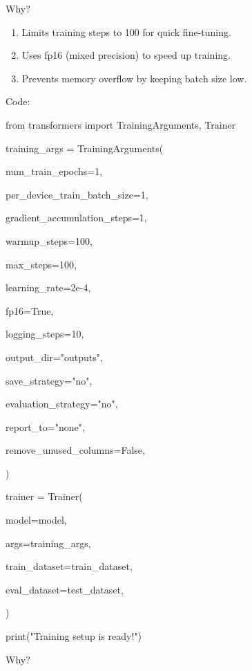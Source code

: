 \documentclass{article} %
\begin{document}
\begin{flushleft}


\noindent Why?
\end{flushleft}

\begin{enumerate}
\item  Limits training steps to 100 for quick fine-tuning.

\item  Uses fp16 (mixed precision) to speed up training.

\item  Prevents memory overflow by keeping batch size low.
\end{enumerate}

\noindent \begin{flushleft}
Code:

\noindent from transformers import TrainingArguments, Trainer

\noindent training\_args = TrainingArguments(

\noindent     num\_train\_epochs=1,

\noindent     per\_device\_train\_batch\_size=1,

\noindent     gradient\_accumulation\_steps=1,

\noindent     warmup\_steps=100,

\noindent     max\_steps=100,

\noindent     learning\_rate=2e-4,

\noindent     fp16=True,

\noindent     logging\_steps=10,

\noindent     output\_dir="outputs",

\noindent     save\_strategy="no",

\noindent     evaluation\_strategy="no",

\noindent     report\_to="none",

\noindent     remove\_unused\_columns=False,

\noindent )

\noindent 

\noindent trainer = Trainer(

\noindent     model=model,

\noindent     args=training\_args,

\noindent     train\_dataset=train\_dataset,

\noindent     eval\_dataset=test\_dataset,

\noindent )

\noindent print("Training setup is ready!")

\noindent 
\newline

\noindent \textbf{}
\newline

\noindent Why?
\end{flushleft}
\end{document}
